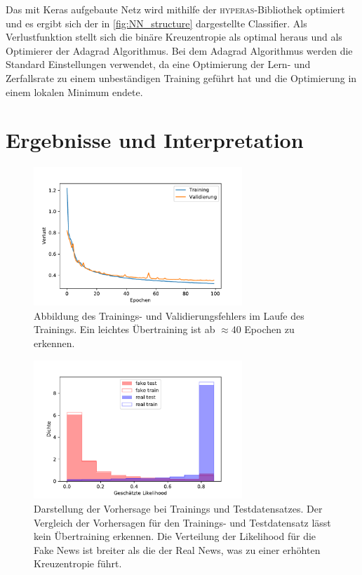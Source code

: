 Das mit Keras\cite{keras} aufgebaute Netz wird mithilfe der \textsc{hyperas}-Bibliothek\cite{hyperas} optimiert und 
es ergibt sich der in \autoref{fig:NN_structure} dargestellte Classifier.
Als Verlustfunktion stellt sich die binäre Kreuzentropie als optimal heraus und als Optimierer der Adagrad Algorithmus.
Bei dem Adagrad Algorithmus werden die Standard Einstellungen verwendet, 
da eine Optimierung der Lern- und Zerfallsrate zu einem unbeständigen Training geführt hat und die Optimierung in einem 
lokalen Minimum endete.


\chapter{Ergebnisse und Interpretation}
\begin{figure}
    \centering
    \includegraphics[width=0.7\textwidth]{pictures/history_bow_best.pdf}
    \caption{Abbildung des Trainings- und Validierungsfehlers im Laufe des Trainings. Ein leichtes Übertraining
            ist ab $\approx 40$ Epochen zu erkennen.}
    \label{fig:history}
\end{figure}
\begin{figure}
    \centering
    \includegraphics[width=0.7\textwidth]{pictures/prob_bow_best_nn.pdf}
    \caption{Darstellung der Vorhersage bei Trainings und Testdatensatzes. Der Vergleich der Vorhersagen für den 
            Trainings- und Testdatensatz lässt kein Übertraining erkennen. Die Verteilung der Likelihood 
            für die Fake News ist breiter als die der Real News, was zu einer erhöhten Kreuzentropie führt.}
    \label{fig:probs}
\end{figure}

